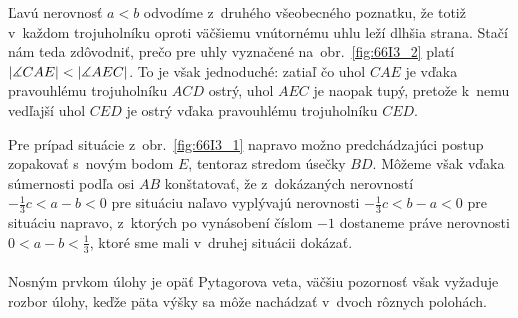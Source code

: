 {Ľavú nerovnosť $a < b$ odvodíme z~druhého všeobecného poznatku, že totiž v~každom trojuholníku oproti väčšiemu vnútornému uhlu leží dlhšia strana. Stačí nám teda zdôvodniť, prečo pre uhly vyznačené na~obr.~\ref{fig:66I3_2} platí $|\measuredangle CAE| < |\measuredangle AEC|$. To je však jednoduché: zatiaľ čo uhol $CAE$ je vďaka pravouhlému trojuholníku $ACD$ ostrý, uhol $AEC$ je naopak tupý, pretože k~nemu vedľajší uhol $CED$ je ostrý vďaka pravouhlému trojuholníku $CED$.

Pre prípad situácie z~obr.~\ref{fig:66I3_1} napravo možno predchádzajúci postup zopakovať s~novým bodom $E$, tentoraz stredom úsečky $BD$. Môžeme však vďaka súmernosti podľa osi $AB$ konštatovať, že z~dokázaných nerovností $-\frac{1}{3}c < a - b < 0$ pre situáciu naľavo vyplývajú nerovnosti $-\frac{1}{3}c < b - a < 0$ pre situáciu napravo, z~ktorých po vynásobení číslom $-1$ dostaneme práve nerovnosti $0 < a - b <\frac{1}{3}$, ktoré sme mali v~druhej situácii dokázať.\\
\\
\kom Nosným prvkom úlohy je opäť Pytagorova veta, väčšiu pozornosť však vyžaduje rozbor úlohy, keďže päta výšky sa môže nachádzať v~dvoch rôznych polohách.\\
\\
}
